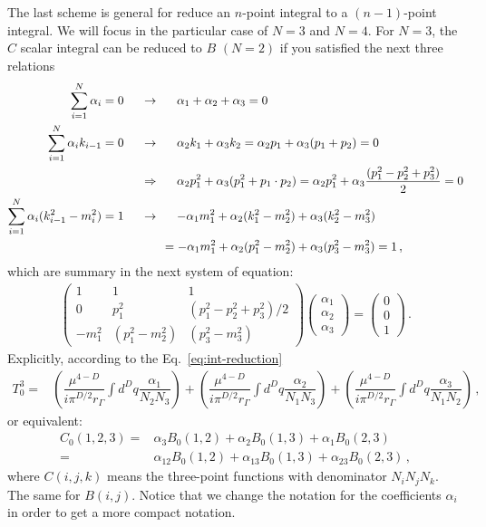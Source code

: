 The last scheme is general for reduce an $n$-point integral to a $(n-1)$-point integral. We will focus in the particular case of $N=3$ and $N=4$.
%
For $N=3$, the $C$ scalar integral can be reduced to $B$ $(N=2)$ if you satisfied the next three relations
\begin{align}
\sum_{i=1}^N\alpha_i = 0 \hspace{0.5 cm} &\rightarrow \hspace{0.5  cm} \alpha_1+\alpha_2+\alpha_3=0 \\
\sum_{i=1}^N\alpha_ik_{i-1} = 0 \hspace{0.5  cm} &\rightarrow \hspace{0.5  cm} \alpha_2k_1+\alpha_3k_2=\alpha_2p_1+\alpha_3(p_1+p_2)=0 \nonumber \\ 
& \Rightarrow \hspace{0.5  cm} \alpha_2p_1^2+\alpha_3(p_1^2+p_1\cdot p_2)= \alpha_2p_1^2+\alpha_3\dfrac{(p_1^2-p_2^2+p_3^2)}{2}=0 \\
\sum_{i=1}^N\alpha_i (k_{i-1}^2-m_i^2) = 1\hspace{0.5  cm} &\rightarrow \hspace{0.5  cm} 
-\alpha_1m_1^2+ \alpha_2(k_1^2-m_2^2)+ \alpha_3(k_2^2-m_3^2)\nonumber\\
&\hspace{0.6 cm}=-\alpha_1m_1^2+ \alpha_2(p_1^2-m_2^2)+ \alpha_3(p_3^2-m_3^2)=1\,,
\end{align} 
which are summary in the next system of equation:
\begin{align}
\begin{pmatrix}
1 & 1 & 1 \\
0 & p_1^2 & (p_1^2-p_2^2+p_3^2)/2 \\
 -m_1^2 & (p_1^2-m_2^2) & (p_3^2-m_3^2)
\end{pmatrix}
\begin{pmatrix}
\alpha_1 \\ \alpha_2 \\ \alpha_3
\end{pmatrix}=
\begin{pmatrix}
0 \\ 0 \\ 1
\end{pmatrix}\,.
\end{align}
%
Explicitly, according to the Eq.~\eqref{eq:int-reduction}
\begin{align}
\label{eq:t30}
T^3_0=& \left(\dfrac{\mu^{4-D}}{i\pi^{D/2}r_{\Gamma}}\int d^Dq \dfrac{\alpha_1}{N_2N_3}\right)
+\left(\dfrac{\mu^{4-D}}{i\pi^{D/2}r_{\Gamma}}\int d^Dq \dfrac{\alpha_2}{N_1N_3}\right)
+\left(\dfrac{\mu^{4-D}}{i\pi^{D/2}r_{\Gamma}}\int d^Dq \dfrac{\alpha_3}{N_1N_2}\right)\,,
\end{align}
or equivalent:
\begin{align}
C_0(1,2,3)=&\alpha_3B_0(1,2)+\alpha_2B_0(1,3) +\alpha_1B_0(2,3)\nonumber \\
=& \alpha_{12}B_0(1,2)+\alpha_{13}B_0(1,3)+\alpha_{23}B_0(2,3)\,, 
\end{align}
where $C(i,j,k)$ means the three-point functions with denominator $N_iN_jN_k$. The same for $B(i,j)$. 
Notice that we change the notation for the coefficients $\alpha_i$ in order to get a more compact notation. 

